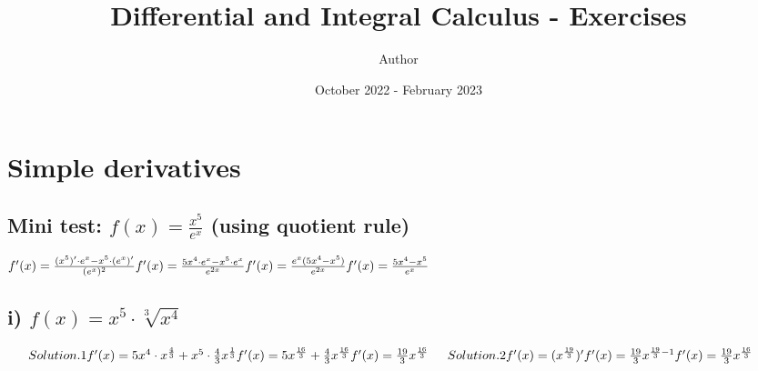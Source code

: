 \documentclass{article}
\title{Differential and Integral Calculus - Exercises}
\author{Author}
\date{October 2022 - February 2023}
\begin{document}
\maketitle

\section{Simple derivatives}

\subsection{Mini test: $f(x) = \frac{x^5}{e^x}$ (using quotient rule)}
$
  f'(x) = \frac{(x^5)' \cdot e^x - x^5 \cdot (e^x)'}{(e^x)^2}
  \\
  \\
  f'(x) = \frac{5x^4 \cdot e^x - x^5 \cdot e^x}{e^{2x}}
  \\
  \\
  f'(x) = \frac{e^x (5x^4 - x^5)}{e^{2x}}
  \\
  \\
  f'(x) = \frac{5x^4 - x^5}{e^x}
$

\subsection{i) $f(x) = x^5 \cdot \sqrt[3]{x^4}$}
$
  \indent Solution.1
  \\
  \\
  f'(x) = 5x^4 \cdot x^\frac{4}{3} + x^5 \cdot \frac{4}{3}x^\frac{1}{3}
  \\
  \\
  f'(x) = 5x^\frac{16}{3} + \frac{4}{3}x^\frac{16}{3}
  \\
  \\
  f'(x) = \frac{19}{3}x^\frac{16}{3}
  \\
  \\
  \indent Solution.2
  \\
  \\
  f'(x) = (x^\frac{19}{3})'
  \\
  \\
  f'(x) = \frac{19}{3}x^{\frac{19}{3}-1}
  \\
  \\
  f'(x) = \frac{19}{3}x^\frac{16}{3}
$
\end{document}
